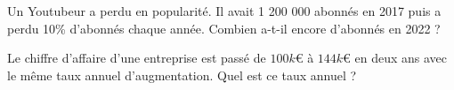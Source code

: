 \documentclass[a4paper,landscape,twocolumn,classe=1STI2D]{exercice}
\newcounter{exercicesCounter}
\begin{document}
{\begin{minipage}{0.23\linewidth}
		\vspace{\placeDeCorrection}
	\end{minipage}
	\hfill\vline\hfill
	\begin{minipage}{0.23\linewidth}
		Un Youtubeur a perdu en
		popularité. Il avait 1 200 000
		abonnés en 2017 puis a perdu
		10\% d’abonnés chaque année.
		Combien a-t-il encore d’abonnés
		en 2022 ?

		\vspace{\placeDeCorrection}
	\end{minipage}
	\hfill\vline\hfill
	\begin{minipage}{0.23\linewidth}
		Le chiffre d’affaire d’une
		entreprise est passé de $100 k€$ à
		$144 k€$ en deux ans avec le même
		taux annuel d’augmentation.
		Quel est ce taux annuel ?

		\vspace{\placeDeCorrection}
	\end{minipage}
}

\newpage

\setcounter{exercicesCounter}{1}
\end{document}
